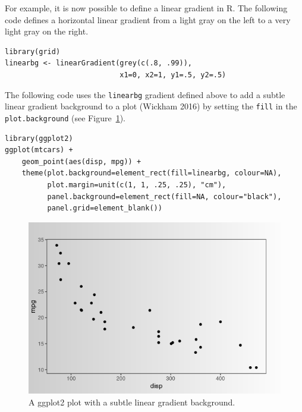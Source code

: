 For example, it is now possible to define a linear gradient in R.
The following code defines a horizontal linear gradient from a light gray
on the left
to a very light gray on the right.

\begin{verbatim}
library(grid)
linearbg <- linearGradient(grey(c(.8, .99)), 
                           x1=0, x2=1, y1=.5, y2=.5)
\end{verbatim}

The following code uses the \texttt{linearbg} gradient defined above to
add a subtle linear gradient background to a  plot
(Wickham 2016) by setting
the \texttt{fill} in the \texttt{plot.background}
(see Figure~\ref{fig:ggplot2bg}).

\begin{verbatim}
library(ggplot2)
ggplot(mtcars) +
    geom_point(aes(disp, mpg)) +
    theme(plot.background=element_rect(fill=linearbg, colour=NA),
          plot.margin=unit(c(1, 1, .25, .25), "cm"),
          panel.background=element_rect(fill=NA, colour="black"),
          panel.grid=element_blank())
\end{verbatim}

\begin{figure}[h]
\includegraphics[width=1\linewidth]{murrell-definitions-2023_files/figure-latex/ggplot2bg-1} \caption{A ggplot2 plot with a subtle linear gradient background.}\label{fig:ggplot2bg}
\end{figure}

